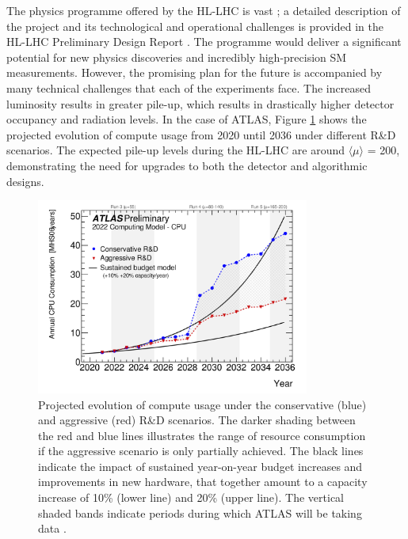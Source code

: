 The physics programme offered by the HL-LHC is vast \cite{big-report}; a detailed description of the project and its technological and operational challenges is provided in the HL-LHC Preliminary Design Report \cite{Apollinari:2116337}. The programme would deliver a significant potential for new physics discoveries and incredibly high-precision SM measurements. However, the promising plan for the future is accompanied by many technical challenges that each of the experiments face. The increased luminosity results in greater pile-up, which results in drastically higher detector occupancy and radiation levels. In the case of ATLAS, Figure \ref{fig:pileup-walltime} shows the projected evolution of compute usage from 2020 until 2036 under different R\&D scenarios. The expected pile-up levels during the HL-LHC are around $\langle \mu \rangle$ = 200, demonstrating the need for upgrades to both the detector and algorithmic designs.

\begin{figure}[!htbp]
  \centering
  \includegraphics[width=0.8\textwidth]{images/2-LHC-ATLAS/computing-model.png}
  \caption{
    Projected evolution of compute usage under the conservative (blue) and aggressive (red) R\&D scenarios. The darker shading between the red and blue lines illustrates the range of resource consumption if the aggressive scenario is only partially achieved. The black lines indicate the impact of sustained year-on-year budget increases and improvements in new hardware, that together amount to a capacity increase of 10\% (lower line) and 20\% (upper line). The vertical shaded bands indicate periods during which ATLAS will be taking data \cite{Collaboration:2802918}.
  }
  \label{fig:pileup-walltime}
\end{figure}


